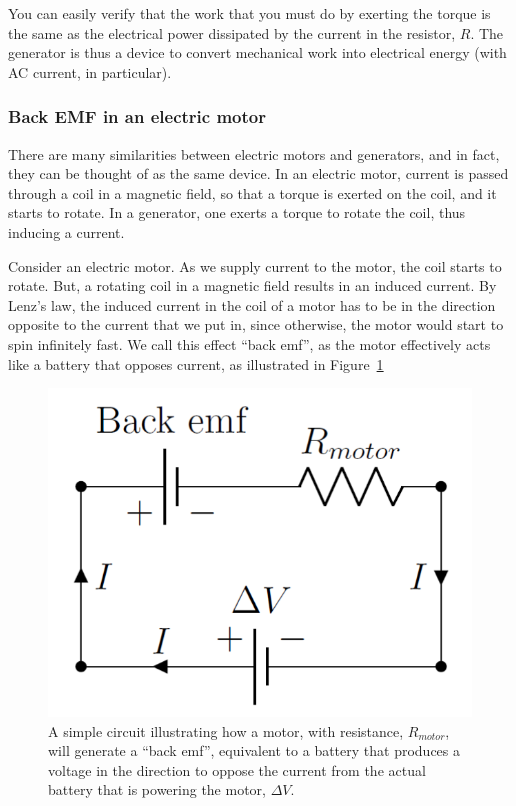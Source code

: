 You can easily verify that the work that you must do by exerting the torque is the same as the electrical power dissipated by the current in the resistor, $R$. The generator is thus a device to convert mechanical work into electrical energy (with AC current, in particular).

\subsubsection{Back EMF in an electric motor}

There are many similarities between electric motors and generators, and in fact, they can be thought of as the same device. In an electric motor, current is passed through a coil in a magnetic field, so that a torque is exerted on the coil, and it starts to rotate. In a generator, one exerts a torque to rotate the coil, thus inducing a current.

Consider an electric motor. As we supply current to the motor, the coil starts to rotate. But, a rotating coil in a magnetic field results in an induced current. By Lenz's law, the induced current in the coil of a motor has to be in the direction opposite to the current that we put in, since otherwise, the motor would start to spin infinitely fast. We call this effect ``back emf'', as the motor effectively acts like a battery that opposes current, as illustrated in Figure~\ref{fig:induction:backemf}

\begin{figure}[!htbp]
\centering
\includegraphics[width=0.3\linewidth]{files/backemf-884fc6af7b406bccea4cff3c4f67981b.png}
\caption[]{A simple circuit illustrating how a motor, with resistance, $R_{motor}$, will generate a ``back emf'', equivalent to a battery that produces a voltage in the direction to oppose the current from the actual battery that is powering the motor, $\Delta V$.}
\label{fig:induction:backemf}
\end{figure}


